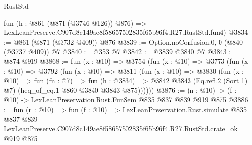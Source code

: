 \begin{lexlean}{RustStd}
\begin{coremodule}
    fun (h : @861 (@871 (@3746 @126)) @876) =>
    LexLeanPreserve.C907d8c149ae8f58657502835f65b96f4.R27.RustStd.fun4)
@3834 := @861 (@871 (@3732 @409)) @876
@3839 := Option.noConfusion.{0, 0} (@840 (@3737 @409)) @7
@3840 := @353 @7
@3842 := @3839 @3840 @7
@3843 := @874 @919
@3868 := fun (x : @10) =>
  @3754
    (fun (x : @10) =>
    @3773
      (fun (x : @10) =>
      @3792
        (fun (x : @10) =>
        @3811
          (fun (x : @10) =>
          @3830
            (fun (x : @10) =>
            fun (fn : @7) =>
            fun (h : @3834) =>
            @3842 @3843 (Eq.refl.{2} (Sort 1) @7) (heq_of_eq.{1} @860 @3840 @3843 @875))))))
@3876 := (n : @10) -> (f : @10) -> LexLeanPreservation.Rust.FunSem @835 @837 @839 @919 @875
@3886 := fun (n : @10) =>
  fun (f : @10) =>
  LexLeanPreservation.Rust.simulate
    @835
    @837
    @839
    LexLeanPreserve.C907d8c149ae8f58657502835f65b96f4.R27.RustStd.crate_ok
    @919
    @875
\end{coremodule}
\end{lexlean}
